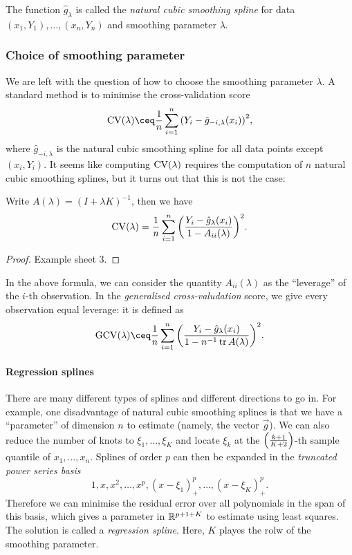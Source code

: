 The function $\hat g_\lambda$ is called the \emph{natural cubic smoothing spline} for data $(x_1, Y_1), \dotsc, (x_n, Y_n)$ and smoothing parameter $\lambda$. 

\subsubsection{Choice of smoothing parameter}
We are left with the question of how to choose the smoothing parameter $\lambda$. A standard method is to minimise the cross-validation score
\[
\CV(\lambda) \ceq \frac1n \sum_{i=1}^n \qty(Y_i - \hat g_{-i, \lambda}(x_i))^2, 
\]
where $\hat g_{-i, \lambda}$ is the natural cubic smoothing spline for all data points except $(x_i, Y_i)$. It seems like computing $\operatorname{CV}(\lambda)$ requires the computation of $n$ natural cubic smoothing splines, but it turns out that this is not the case:
\begin{proposition}
	Write $A(\lambda) = (I + \lambda K)^{-1}$, then we have
	\[
	\operatorname{CV}(\lambda) = \frac1n \sum_{i=1}^n \qty(\frac{Y_i - \hat g_\lambda(x_i)}{1 - A_{ii}(\lambda)})^2. 
	\]
\end{proposition}

\begin{proof}
	Example sheet 3. 
\end{proof}

In the above formula, we can consider the quantity $A_{ii}(\lambda)$ as the ``leverage'' of the $i$-th observation. In the \emph{generalised cross-valudation} score, we give every observation equal leverage: it is defined as
\[
\Rm{GCV}(\lambda) \ceq \frac1n \sum_{i=1}^n \qty(\frac{Y_i - \hat g_\lambda(x_i)}{1 - n^{-1} \tr A(\lambda)})^2. 
\]

\paragraph{Regression splines}
There are many different types of splines and different directions to go in. For example, one disadvantage of natural cubic smoothing splines is that we have a ``parameter'' of dimension $n$ to estimate (namely, the vector $\vec g$). We can also reduce the number of knots to $\xi_1, \dotsc, \xi_K$ and locate $\xi_k$ at the $\qty(\frac{k+1}{K+2})$-th sample quantile of $x_1, \dotsc, x_n$. Splines of order $p$ can then be expanded in the \emph{truncated power series basis}
\[
1, x, x^2, \dotsc, x^p, (x - \xi_1)_+^p, \dotsc, (x - \xi_K)_+^p. 
\]
Therefore we can minimise the residual error over all polynomials in the span of this basis, which gives a parameter in $\mathbb R^{p+1+K}$ to estimate using least squares. The solution is called a \emph{regression spline}. Here, $K$ playes the rolw of the smoothing parameter. 